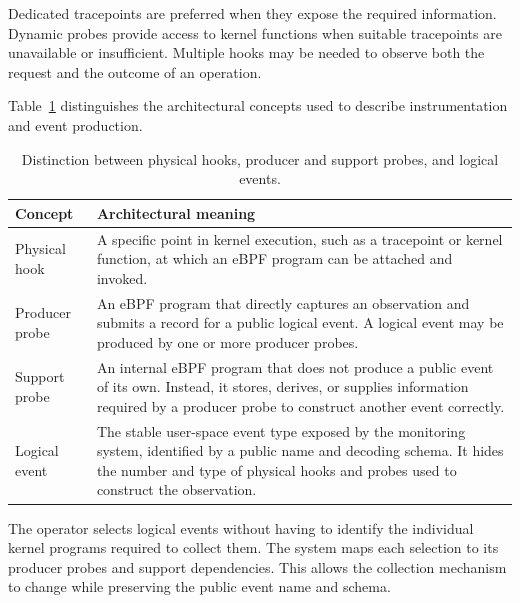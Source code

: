   Dedicated tracepoints are preferred when they expose the required
  information. Dynamic probes provide access to kernel functions when suitable
  tracepoints are unavailable or insufficient. Multiple hooks may be needed
  to observe both the request and the outcome of an operation.

Table~\ref{tab:hooks-probes-events} distinguishes the architectural concepts
used to describe instrumentation and event production.

\begin{table}[H]
    \centering
    \small
    \renewcommand{\arraystretch}{1.18}
    \begin{tabularx}{\textwidth}{
        @{}
        >{\raggedright\arraybackslash}p{}
        >{\raggedright\arraybackslash}X
        @{}
    }
        \toprule
        \textbf{Concept} & \textbf{Architectural meaning} \\
        \midrule

        Physical hook &
        A specific point in kernel execution, such as a tracepoint or kernel
        function, at which an eBPF program can be attached and invoked. \\

        Producer probe &
        An eBPF program that directly captures an observation and submits a
        record for a public logical event. A logical event may be produced by
        one or more producer probes. \\

        Support probe &
        An internal eBPF program that does not produce a public event of its
        own. Instead, it stores, derives, or supplies information required by
        a producer probe to construct another event correctly. \\

        Logical event &
        The stable user-space event type exposed by the monitoring system,
        identified by a public name and decoding schema. It hides the number
        and type of physical hooks and probes used to construct the
        observation. \\

        \bottomrule
    \end{tabularx}
    \caption{Distinction between physical hooks, producer and support probes,
    and logical events.}
    \label{tab:hooks-probes-events}
\end{table}

The operator selects logical events without having to identify the individual
kernel programs required to collect them. The system maps each selection to
its producer probes and support dependencies. This allows the collection
mechanism to change while preserving the public event name and schema.


